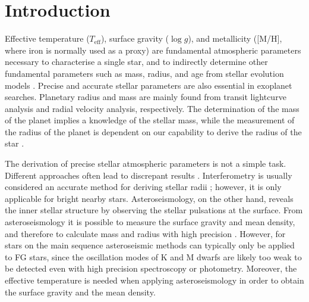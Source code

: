 \documentclass{aa}
\begin{document}
\maketitle



\section{Introduction}
\label{sec:introduction}

Effective temperature ($T_\mathrm{eff}$), surface gravity ($\log g$),
and metallicity ([M/H], where iron is normally used as a proxy)
are fundamental atmospheric parameters necessary to characterise a single
star, and to indirectly determine other fundamental parameters
such as mass, radius, and age from stellar evolution models
\citep[see e.g.][]{Girardi2000,Dotter2008,Baraffe2015}.
Precise and accurate stellar parameters are also essential in
exoplanet searches. Planetary radius and mass are mainly found from
transit lightcurve analysis and radial velocity analysis, respectively. The
determination of the mass of the planet implies a knowledge of the
stellar mass, while the measurement of the radius of the planet
is dependent on our capability to derive the radius of the star
\citep[see e.g.][]{Torres2008,Ammler2009,Torres2012}.

The derivation of precise stellar atmospheric parameters is not a simple task.
Different approaches often lead to discrepant results
\citep[see e.g.][]{Torres2010,Lebzelter2012b,Santos13}. Interferometry is
usually considered  an accurate method for deriving stellar radii
\citep[see e.g.][]{Boyajian2012}; however, it is only applicable for bright
nearby stars. Asteroseismology, on the other hand, reveals the inner stellar
structure by observing the stellar pulsations at the surface. From
asteroseismology it is possible to measure the surface gravity and mean density,
and therefore to calculate mass and radius with high precision \citep[see
e.g.][]{Kjeldsen1995}. However, for stars on the main sequence asteroseismic
methods can typically only be applied to FG stars, since the oscillation modes
of K and M dwarfs are likely too weak to be detected even with high precision
spectroscopy or photometry. Moreover, the effective temperature is needed when
applying asteroseismology in order to obtain the surface gravity and the mean
density.
\end{document}
